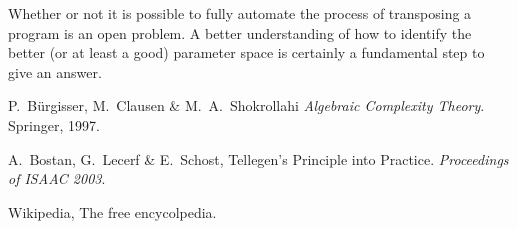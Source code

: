 \documentclass{article}
\begin{document}
  Whether or not it is possible to fully automate the process of
  transposing a program is an open problem. A better understanding of
  how to identify the better (or at least a good) parameter space
  is certainly a fundamental step to give an answer.


  
  \begin{thebibliography}{1}
    
  P.~Bürgisser, M.~Clausen \& M.~A.~Shokrollahi
    \emph{Algebraic Complexity Theory}.
    Springer, 1997.
    
  A.~Bostan, G.~Lecerf \& E.~Schost,
    Tellegen's Principle into Practice.
    \emph{Proceedings of ISAAC 2003}.

  Wikipedia, The free encycolpedia.
  
  \end{thebibliography}
\end{document}

